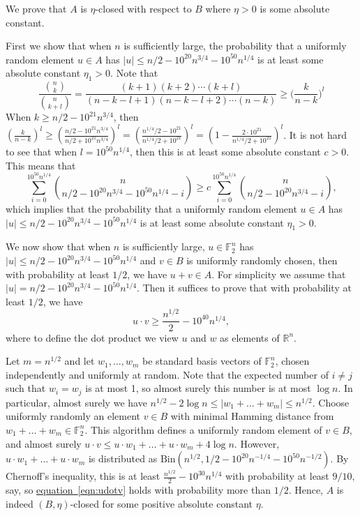 \documentclass[11pt]{article}
\numberwithin{equation}{section}
\theoremstyle{definition}
\theoremstyle{plain}
\newcommand{\R}{\mathbb R}
\newcommand{\expeqref}[2]{\hyperref[#2]{#1~\eqref{#2}}}
\newcommand\F{\mathbb{F}}
\begin{document}
%
%
%
%
%
%
%
%
%

	We prove that $A$ is $\eta$-closed with respect to $B$ where $\eta>0$ is some absolute constant.

	First we show that when $n$ is sufficiently large, the probability that a uniformly random element $u\in A$ has $|u|\leq n/2-10^{20}n^{3/4}-10^{50}n^{1/4}$ is at least some absolute constant $\eta_1>0$. Note that
	\begin{equation*}
		\frac{\binom{n}{k}}{\binom{n}{k+l}}=\frac{(k+1)(k+2)\cdots(k+l)}{(n-k-l+1)(n-k-l+2)\cdots (n-k)}\geq \bigg(\frac{k}{n-k}\bigg)^l
	\end{equation*}
	When $k\geq n/2-10^{21}n^{3/4}$, then $(\frac{k}{n-k})^l\geq (\frac{n/2-10^{21}n^{3/4}}{n/2+10^{21}n^{3/4}})^l=(\frac{n^{1/4}/2-10^{21}}{n^{1/4}/2+10^{21}})^l=(1-\frac{2\cdot 10^{21}}{n^{1/4}/2+10^{21}})^l$. It is not hard to see that when $l=10^{50}n^{1/4}$, then this is at least some absolute constant $c>0$. This means that
	\begin{equation*}
		\sum_{i=0}^{10^{50}n^{1/4}} \binom{n}{n/2-10^{20}n^{3/4}-10^{50}n^{1/4}-i}\geq c \sum_{i=0}^{10^{50}n^{1/4}} \binom{n}{n/2-10^{20}n^{3/4}-i},
	\end{equation*}
	which implies that the probability that a uniformly random element $u\in A$ has $|u|\leq n/2-10^{20}n^{3/4}-10^{50}n^{1/4}$ is at least some absolute constant $\eta_1>0$.
	
	We now show that when $n$ is sufficiently large, $u\in \F_2^n$ has $|u|\leq n/2-10^{20}n^{3/4}-10^{50}n^{1/4}$ and $v\in B$ is uniformly randomly chosen, then with probability at least $1/2$, we have $u+v\in A$. For simplicity we assume that $|u|=n/2-10^{20}n^{3/4}-10^{50}n^{1/4}$. Then it suffices to prove that with probability at least $1/2$, we have
	\begin{equation}
		u\cdot v\geq \frac{n^{1/2}}{2}-10^{40}n^{1/4}, \label{eqn:udotv}
	\end{equation} where to define the dot product we view $u$ and $w$ as elements of $\R^n$.
	
	Let $m=n^{1/2}$ and let $w_1,\dots,w_m$ be standard basis vectors of $\F_2^n$, chosen independently and uniformly at random. Note that the expected number of $i\neq j$ such that $w_i=w_j$ is at most 1, so almost surely this number is at most $\log n$. In particular, almost surely we have $n^{1/2}-2\log n\leq |w_1+\dots+w_m|\leq n^{1/2}$. Choose uniformly randomly an element $v\in B$ with minimal Hamming distance from $w_1+\dots+w_m\in \F_2^n$. This algorithm defines a uniformly random element of $v\in B$, and almost surely $u\cdot v\leq u\cdot w_1+\dots+u\cdot w_m+4\log n$. However, $u\cdot w_1+\dots+u\cdot w_m$ is distributed as $\mathrm{Bin}(n^{1/2},1/2-10^{20}n^{-1/4}-10^{50}n^{-1/2})$. By Chernoff's inequality, this is at least $\frac{n^{1/2}}{2}-10^{30}n^{1/4}$ with probability at least $9/10$, say, so \expeqref{equation}{eqn:udotv} holds with probability more than $1/2$. Hence, $A$ is indeed $(B,\eta)$-closed for some positive absolute constant $\eta$.
\end{document}
